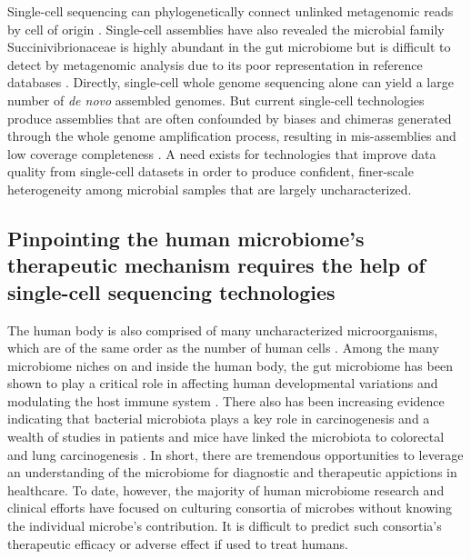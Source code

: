 Single-cell sequencing can phylogenetically connect unlinked metagenomic reads by cell of origin \cite{Rinke:2013bt}. Single-cell assemblies have also revealed the microbial family Succinivibrionaceae is highly abundant in the gut microbiome but is difficult to detect by metagenomic analysis due to its poor representation in reference databases \cite{Xu:2016wt}. Directly, single-cell whole genome sequencing alone can yield a large number of \textit{de novo} assembled genomes. But current single-cell technologies produce assemblies that are often confounded by biases and chimeras generated through the whole genome amplification process, resulting in mis-assemblies and low coverage completeness \cite{Rodrigue:2009gc,VanderAa:2013jz}. A need exists for technologies that improve data quality from single-cell datasets in order to produce confident, finer-scale heterogeneity among microbial samples that are largely uncharacterized. 

\subsection{Pinpointing the human microbiome's therapeutic mechanism requires the help of single-cell sequencing technologies}
The human body is also comprised of many uncharacterized microorganisms, which are of the same order as the number of human cells \cite{Sender:2016ei}. Among the many microbiome niches on and inside the human body, the gut microbiome has been shown to play a critical role in affecting human developmental variations \cite{Yatsunenko:2012gi} and modulating the host immune system \cite{GevaZatorsky:2017fy}. There also has been increasing evidence indicating that bacterial microbiota plays a key role in carcinogenesis \cite{Plottel:2011io} and a wealth of studies in patients and mice have linked the microbiota to colorectal and lung carcinogenesis \cite{Yoshimoto:2013ff,Uronis:2009es}. In short, there are tremendous opportunities to leverage an understanding of the microbiome for diagnostic and therapeutic appictions in healthcare. To date, however, the majority of human microbiome research and clinical efforts have focused on culturing consortia of microbes without knowing the individual microbe's contribution. It is difficult to predict such consortia's therapeutic efficacy or adverse effect if used to treat humans. 

